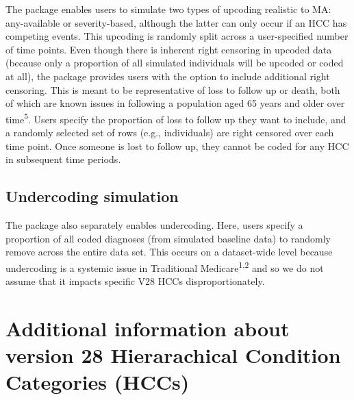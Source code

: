 \documentclass[
  12pt,
  number,
  doubleblind]{elsarticle}
\begin{document}
The package enables users to simulate two types of upcoding realistic to
MA: any-available or severity-based, although the latter can only occur
if an HCC has competing events. This upcoding is randomly split across a
user-specified number of time points. Even though there is inherent
right censoring in upcoded data (because only a proportion of all
simulated individuals will be upcoded or coded at all), the package
provides users with the option to include additional right censoring.
This is meant to be representative of loss to follow up or death, both
of which are known issues in following a population aged 65 years and
older over time\textsuperscript{5}. Users specify the proportion of loss
to follow up they want to include, and a randomly selected set of rows
(e.g., individuals) are right censored over each time point. Once
someone is lost to follow up, they cannot be coded for any HCC in
subsequent time periods.

\subsection{Undercoding simulation}\label{sec-undercoding-simulation}

The package also separately enables undercoding. Here, users specify a
proportion of all coded diagnoses (from simulated baseline data) to
randomly remove across the entire data set. This occurs on a
dataset-wide level because undercoding is a systemic issue in
Traditional Medicare\textsuperscript{1,2} and so we do not assume that
it impacts specific V28 HCCs disproportionately.

\newpage{}

\section{Additional information about version 28 Hierarachical Condition
Categories (HCCs)}\label{sec-add-info}
\end{document}
